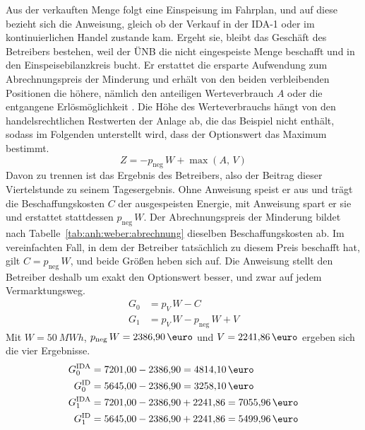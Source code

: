 Aus der verkauften Menge folgt eine Einspeisung im Fahrplan, und auf diese bezieht sich die Anweisung, gleich ob der Verkauf in der \ac{IDA-1} oder im kontinuierlichen Handel zustande kam. Ergeht sie, bleibt das Geschäft des Betreibers bestehen, weil der \ac{ÜNB} die nicht eingespeiste Menge beschafft und in den Einspeisebilanzkreis bucht. Er erstattet die ersparte Aufwendung zum Abrechnungspreis der Minderung und erhält von den beiden verbleibenden Positionen die höhere, nämlich den anteiligen Werteverbrauch $A$ oder die entgangene Erlösmöglichkeit \cite{bundesnetzagentur_anlage1_2024}. Die Höhe des Werteverbrauchs hängt von den handelsrechtlichen Restwerten der Anlage ab, die das Beispiel nicht enthält, sodass im Folgenden unterstellt wird, dass der Optionswert das Maximum bestimmt.
\begin{equation}
  Z = - p_{\mathrm{neg}} \, W + \max\left( A,\, V \right)
  \label{eq:anh:weber:verguetung}
\end{equation}
Davon zu trennen ist das Ergebnis des Betreibers, also der Beitrag dieser Viertelstunde zu seinem Tagesergebnis. Ohne Anweisung speist er aus und trägt die Beschaffungskosten $C$ der ausgespeisten Energie, mit Anweisung spart er sie und erstattet stattdessen $p_{\mathrm{neg}} \, W$. Der Abrechnungspreis der Minderung bildet nach Tabelle~\ref{tab:anh:weber:abrechnung} dieselben Beschaffungskosten ab. Im vereinfachten Fall, in dem der Betreiber tatsächlich zu diesem Preis beschafft hat, gilt $C = p_{\mathrm{neg}} \, W$, und beide Größen heben sich auf. Die Anweisung stellt den Betreiber deshalb um exakt den Optionswert besser, und zwar auf jedem Vermarktungsweg.
\begin{align}
  G_0 &= p_V \, W - C \label{eq:anh:weber:g0}\\
  G_1 &= p_V \, W - p_{\mathrm{neg}} \, W + V \label{eq:anh:weber:g1}
\end{align}
Mit $W = \SI{50}{MWh}$, $p_{\mathrm{neg}} \, W = 2386{,}90\,\text{\euro}$ und $V = 2241{,}86\,\text{\euro}$ ergeben sich die vier Ergebnisse.
\begin{align}
  G_0^{\mathrm{IDA}} &= 7201{,}00 - 2386{,}90 = 4814{,}10\,\text{\euro} \label{eq:anh:weber:g0ida}\\
  G_0^{\mathrm{ID}} &= 5645{,}00 - 2386{,}90 = 3258{,}10\,\text{\euro} \label{eq:anh:weber:g0id}\\
  G_1^{\mathrm{IDA}} &= 7201{,}00 - 2386{,}90 + 2241{,}86 = 7055{,}96\,\text{\euro} \label{eq:anh:weber:g1ida}\\
  G_1^{\mathrm{ID}} &= 5645{,}00 - 2386{,}90 + 2241{,}86 = 5499{,}96\,\text{\euro} \label{eq:anh:weber:g1id}
\end{align}
